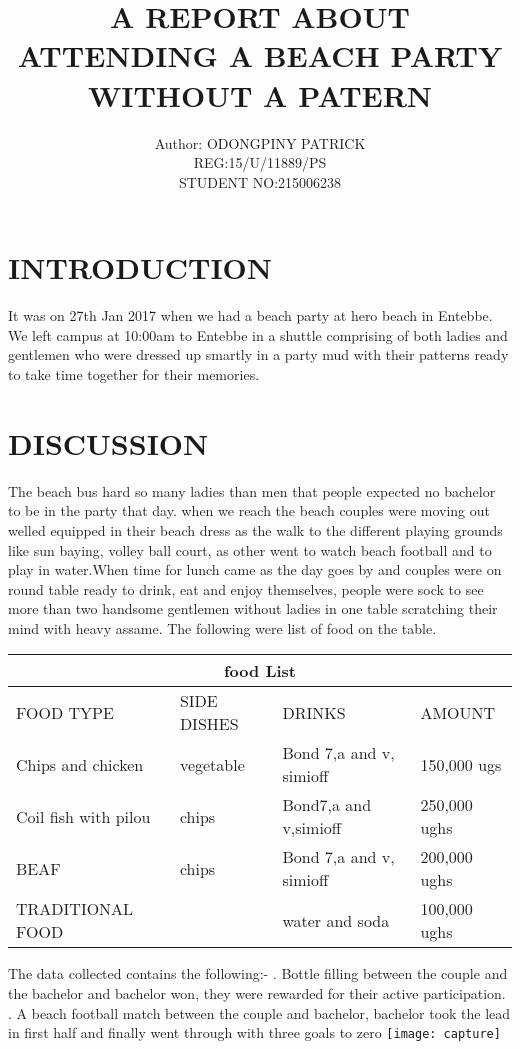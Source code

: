 \documentclass{article}
\begin{document}
\title{A REPORT ABOUT ATTENDING A BEACH PARTY WITHOUT A PATERN}
\author{ Author: ODONGPINY PATRICK \\ REG:15/U/11889/PS  \\STUDENT NO:215006238}

\maketitle


	
\section{INTRODUCTION}
It was on 27th Jan 2017 when we had a beach party at hero beach in Entebbe. We  left campus at 10:00am to Entebbe in a shuttle comprising of both ladies and gentlemen who were dressed up smartly in a party mud with their patterns ready to take time together  for their memories.
\section{DISCUSSION}
The beach bus hard so many ladies than men that people expected no bachelor to be in the party that day. when we reach the beach couples were moving out welled equipped in their beach dress as the walk to the different playing grounds like sun baying, volley ball court, as other went to watch beach football and to play in water.When time for lunch came as the day goes by and couples were on round table ready to drink, eat and enjoy themselves, people were sock to see more than two handsome gentlemen without ladies in one table scratching their mind with heavy assame.
The following were list of food on the table.
\begin{tabular}{ |p{3cm}|p{3cm}|p{3cm}|p{3cm}|  }
	\hline
	\multicolumn{4}{|c|}{food List} \\
	\hline
	FOOD TYPE &SIDE DISHES&DRINKS &AMOUNT\\
	\hline
	   Chips and chicken & vegetable & Bond 7,a and v, simioff & 150,000 ugs\\
	 Coil fish with pilou & chips & Bond7,a and v,simioff & 250,000 ughs \\
	 BEAF & chips & Bond 7,a and v, simioff & 200,000 ughs\\
	  TRADITIONAL FOOD &  & water and soda & 100,000 ughs\\
	\hline
\end{tabular}


The data collected contains the following:-
\newline
{}.	Bottle filling between the couple and the bachelor and bachelor won, they were rewarded for their active participation.
.	A beach football match between the couple and bachelor, bachelor took the lead in first half and finally went through with three goals to zero
\newline
\texttt{[image: capture]}
\end{document}
